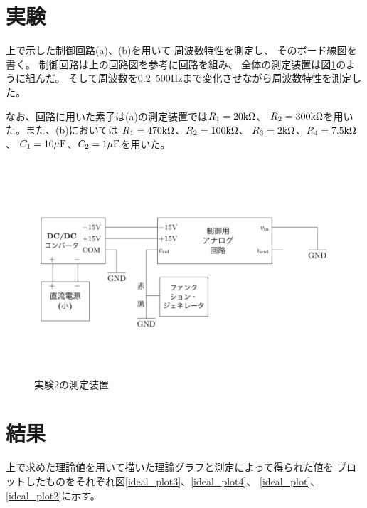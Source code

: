 \documentclass[uplatex, 11pt,a4j, titlepage]{jsarticle}
\begin{document}
\newpage

\section{実験}

上で示した制御回路(a)、(b)を用いて
周波数特性を測定し、
そのボード線図を書く。
制御回路は上の回路図を参考に回路を組み、
全体の測定装置は図\ref{souchi2}のように組んだ。
そして周波数を0.2~500Hzまで変化させながら周波数特性を測定した。

なお、回路に用いた素子は(a)の測定装置では$R_1=20{\rm k \Omega}$、
$R_2=300{\rm k \Omega}$を用いた。また、(b)においては
$R_1=470{\rm k \Omega}$、$R_2=100{\rm k \Omega}$、
$R_3=2{\rm k \Omega}$、$R_4=7.5{\rm k \Omega}$、
$C_1=10{\rm \mu F}$、$C_2=1{\rm \mu F}$を用いた。

\begin{figure}[h]
    \centering
    \includegraphics[width=12cm]{souchi2.pdf}
    \caption{実験2の測定装置}
    \label{souchi2}
\end{figure}

\newpage

\section{結果}

上で求めた理論値を用いて描いた理論グラフと測定によって得られた値を
プロットしたものをそれぞれ図\ref{ideal_plot3}、\ref{ideal_plot4}、
\ref{ideal_plot}、\ref{ideal_plot2}に示す。
\end{document}
